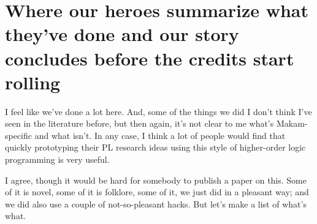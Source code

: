 \section{Where our heroes summarize what they've done and our story
concludes before the credits start
rolling}\label{where-our-heroes-summarize-what-theyve-done-and-our-story-concludes-before-the-credits-start-rolling}

\heroSTUDENT{} I feel like we've done a lot here. And, some of the things we
did I don't think I've seen in the literature before, but then again,
it's not clear to me what's Makam-specific and what isn't. In any case,
I think a lot of people would find that quickly prototyping their PL
research ideas using this style of higher-order logic programming is
very useful.

\heroADVISOR{} I agree, though it would be hard for somebody to publish a
paper on this. Some of it is novel, some of it is folklore, some of it,
we just did in a pleasant way; and we did also use a couple of
not-so-pleasant hacks. But let's make a list of what's what.

